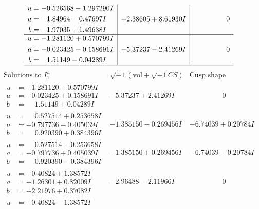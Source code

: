 \documentclass[1p]{elsarticle_modified}
\theoremstyle{definition}
\newcommand{\I}{\sqrt{-1}}
\begin{document}
$$\begin{array}{c|c|c}
\begin{aligned}
u &= -0.526568 - 1.297290 I \\
a &= -1.84964 - 0.47697 I \\
b &= -1.97035 + 1.49638 I\end{aligned}
 & -2.38605 + 8.61930 I & \phantom{-0.000000 } 0 \\ \hline\begin{aligned}
u &= -1.281120 + 0.570799 I \\
a &= -0.023425 - 0.158691 I \\
b &= \phantom{-}1.51149 - 0.04289 I\end{aligned}
 & -5.37237 - 2.41269 I & \phantom{-0.000000 } 0\\
 \hline 
 \end{array}$$\newpage$$\begin{array}{c|c|c}  
\text{Solutions to }I^u_{1}& \I (\text{vol} + \sqrt{-1}CS) & \text{Cusp shape}\\
 \hline 
\begin{aligned}
u &= -1.281120 - 0.570799 I \\
a &= -0.023425 + 0.158691 I \\
b &= \phantom{-}1.51149 + 0.04289 I\end{aligned}
 & -5.37237 + 2.41269 I & \phantom{-0.000000 } 0 \\ \hline\begin{aligned}
u &= \phantom{-}0.527514 + 0.253658 I \\
a &= -0.797736 - 0.405039 I \\
b &= \phantom{-}0.920390 + 0.384396 I\end{aligned}
 & -1.385150 - 0.269456 I & -6.74039 + 0.20784 I \\ \hline\begin{aligned}
u &= \phantom{-}0.527514 - 0.253658 I \\
a &= -0.797736 + 0.405039 I \\
b &= \phantom{-}0.920390 - 0.384396 I\end{aligned}
 & -1.385150 + 0.269456 I & -6.74039 - 0.20784 I \\ \hline\begin{aligned}
u &= -0.40824 + 1.38572 I \\
a &= -1.26301 + 0.82009 I \\
b &= -2.21976 + 0.37082 I\end{aligned}
 & -2.96488 - 2.11966 I & \phantom{-0.000000 } 0 \\ \hline\begin{aligned}
u &= -0.40824 - 1.38572 I \\

\end{aligned}
\end{array}$$
\end{document}
